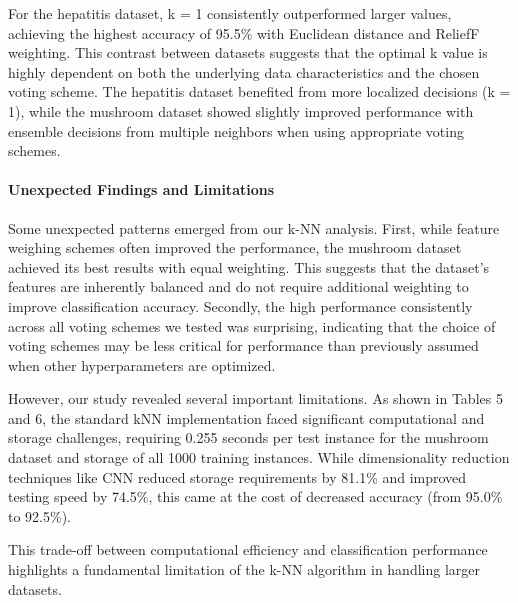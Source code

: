 For the hepatitis dataset, k = 1 consistently
outperformed larger values, achieving the highest accuracy of 95.5\% with Euclidean distance and ReliefF weighting.
This contrast between datasets suggests that the optimal k value is highly dependent
on both the underlying data characteristics and the chosen voting scheme.
The hepatitis dataset benefited from more localized decisions (k = 1), while the mushroom
dataset showed slightly improved performance with ensemble decisions from multiple neighbors when using appropriate voting schemes.

\paragraph{Unexpected Findings and Limitations}
Some unexpected patterns emerged from our k-NN analysis. First, while feature weighing schemes
often improved the performance, the mushroom dataset achieved its best results with equal weighting. This suggests that the
dataset's features are inherently balanced and do not require additional weighting to improve classification accuracy.
Secondly, the high performance consistently across all voting schemes we tested was surprising, indicating that the 
choice of voting schemes may be less critical for performance than previously assumed when other hyperparameters are optimized.

However, our study revealed several important limitations. As shown in Tables 5 and 6, the standard
kNN implementation faced significant computational and storage challenges, requiring 0.255 seconds
per test instance for the mushroom dataset and storage of all 1000 training instances. 
While dimensionality reduction techniques like CNN reduced storage requirements by
81.1\% and improved testing speed by 74.5\%, this came at the cost of decreased accuracy (from 95.0\% to 92.5\%).

This trade-off between computational efficiency and classification performance highlights
a fundamental limitation of the k-NN algorithm in handling larger datasets.